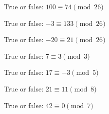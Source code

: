   \begin{myenum}
    \item True or false: $100 \equiv 74 \pmod{26}$
    \item True or false: $-3 \equiv 133 \pmod{26}$
    \item True or false: $-20 \equiv 21 \pmod{26}$
    \item True or false: $7 \equiv 3 \pmod{3}$
    \item True or false: $17 \equiv -3 \pmod{5}$
    \item True or false: $21 \equiv 11 \pmod{8}$
    \item True or false: $42 \equiv 0 \pmod{7}$
  \end{myenum}

